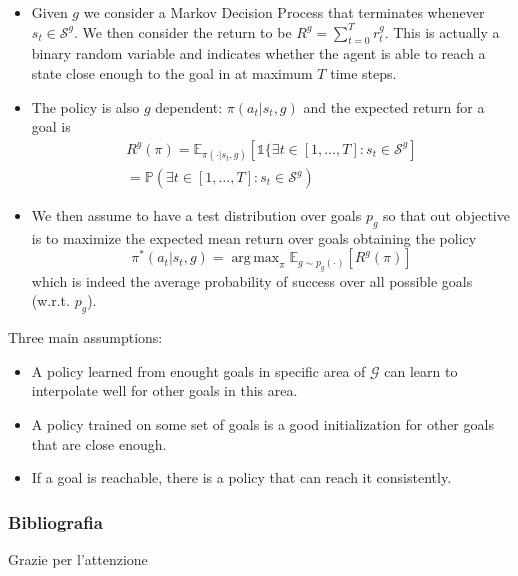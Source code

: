 \documentclass{beamer}
\theoremstyle{plain}
\theoremstyle{definition}
\theoremstyle{remark}
\newcommand{\Pro}{\mathds{P}}
\newcommand{\E}{\mathds{E}}
\DeclareMathOperator*{\argmax}{arg\,max}
\begin{document}
\begin{frame}
	\begin{itemize}
		\item Given $g$ we consider a Markov Decision Process that terminates whenever $s_t\in \mathcal{S}^g$. We then consider the return to be $R^g = \sum_{t=0}^{T}{r_t^g}$. This is actually a binary random variable and indicates whether the agent is able to reach a state close enough to the goal in at maximum $T$ time steps.
		\item The policy is also $g$ dependent: $\pi(a_t|s_t,g)$ and the expected return for a goal is
			\begin{align*}
				R^g(\pi) = \E_{\pi(\cdot|s_t,g)}\left[\mathds{1}\{\exists t\in[1,\ldots, T]: s_t\in\mathcal{S}^g\right]\\
				= \Pro\left(\exists t\in[1,\ldots, T]: s_t\in\mathcal{S}^g\right)
			\end{align*}
		\item We then assume to have a test distribution over goals $p_g$ so that out objective is to maximize the expected mean return over goals obtaining the policy
			\begin{equation*}
				\pi^{*}(a_t|s_t,g) = \argmax_{\pi}\E_{g\sim p_g(\cdot)}[R^g(\pi)]
			\end{equation*}
			which is indeed the average probability of success over all possible goals (w.r.t. $p_g$).
	\end{itemize}
\end{frame}

\begin{frame}
	Three main assumptions:
	\begin{itemize}
		\item A policy learned from enought goals in specific area of $\mathcal{G}$ can learn to interpolate well for other goals in this area.
		\item A policy trained on some set of goals is a good initialization for other goals that are close enough.
		\item If a goal is reachable, there is a policy that can reach it consistently.
	\end{itemize}
\end{frame}

\nocite{AGG}

\begin{frame}[allowframebreaks]
	\frametitle{Bibliografia}
	
	
\end{frame}

\begin{frame}
	\Huge{\centerline{Grazie per l'attenzione}}
\end{frame}

\end{document}
